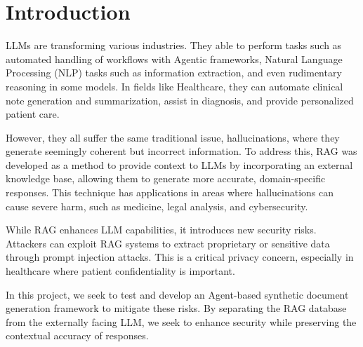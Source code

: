 \chapter{Introduction}
LLMs are transforming various industries. They able to perform tasks such as automated handling of workflows with Agentic frameworks, Natural Language Processing (NLP) tasks such as information extraction, and even rudimentary reasoning in some models. In fields like Healthcare, they can automate clinical note generation and summarization, assist in diagnosis, and provide personalized patient care.

However, they all suffer the same traditional issue, hallucinations, where they generate seemingly coherent but incorrect information. To address this, RAG was developed as a method to provide context to LLMs by incorporating an external knowledge base, allowing them to generate more accurate, domain-specific responses. This technique has applications in areas where hallucinations can cause severe harm, such as medicine, legal analysis, and cybersecurity.

While RAG enhances LLM capabilities, it introduces new security risks. Attackers can exploit RAG systems to extract proprietary or sensitive data through prompt injection attacks. This is a critical privacy concern, especially in healthcare where patient confidentiality is important.

In this project, we seek to test and develop an Agent-based synthetic document generation framework to mitigate these risks. By separating the RAG database from the externally facing LLM, we seek to enhance security while preserving the contextual accuracy of responses.
